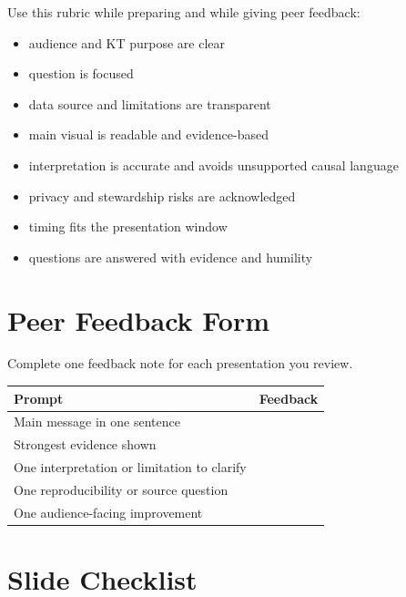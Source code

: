 \documentclass[
  letterpaper,
  DIV=11,
  numbers=noendperiod,
  oneside]{scrreprt}
\providecommand{\tightlist}{%
  \setlength{\itemsep}{0pt}\setlength{\parskip}{0pt}}
\begin{document}

Use this rubric while preparing and while giving peer feedback:

\begin{itemize}
\tightlist
\item
  audience and KT purpose are clear
\item
  question is focused
\item
  data source and limitations are transparent
\item
  main visual is readable and evidence-based
\item
  interpretation is accurate and avoids unsupported causal language
\item
  privacy and stewardship risks are acknowledged
\item
  timing fits the presentation window
\item
  questions are answered with evidence and humility
\end{itemize}

\section*{Peer Feedback Form}\label{peer-feedback-form-1}


Complete one feedback note for each presentation you review.

\begin{longtable}[]{@{}ll@{}}
\toprule\noalign{}
Prompt & Feedback \\
\midrule\noalign{}
\endhead
\bottomrule\noalign{}
\endlastfoot
Main message in one sentence & \\
Strongest evidence shown & \\
One interpretation or limitation to clarify & \\
One reproducibility or source question & \\
One audience-facing improvement & \\
\end{longtable}

\section*{Slide Checklist}\label{slide-checklist}

\end{document}
